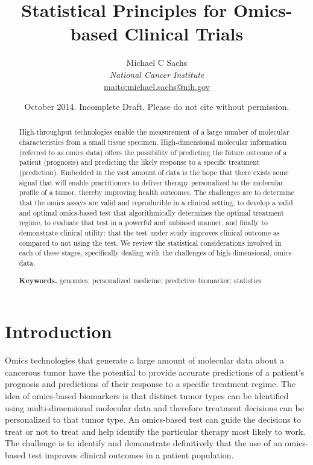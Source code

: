 \documentclass[11pt]{article}
\title{\bigskip \bigskip Statistical Principles for Omics-based Clinical Trials}
\author{\Large Michael C Sachs\vspace{0.05in} \\ \normalsize\emph{National Cancer Institute} \\ \footnotesize \url{maito:michael.sachs@nih.gov}\vspace*{0.2in}\\ }
\date{\footnotesize October 2014. Incomplete Draft. Please do not cite without permission.}
\begin{document}
  
		




\maketitle


\begin{abstract}

\noindent High-throughput technologies enable the measurement of a large number of
molecular characteristics from a small tissue specimen. High-dimensional
molecular information (referred to as omics data) offers the possibility
of predicting the future outcome of a patient (prognosis) and predicting
the likely response to a specific treatment (prediction). Embedded in
the vast amount of data is the hope that there exists some signal that
will enable practitioners to deliver therapy personalized to the
molecular profile of a tumor, thereby improving health outcomes. The
challenges are to determine that the omics assays are valid and
reproducible in a clinical setting, to develop a valid and optimal
omics-based test that algorithmically determines the optimal treatment
regime, to evaluate that test in a powerful and unbiased manner, and
finally to demonstrate clinical utility: that the test under study
improves clinical outcome as compared to not using the test. We review
the statistical considerations involved in each of these stages,
specifically dealing with the challenges of high-dimensional, omics
data.

\smallskip
\noindent \textbf{Keywords.} genomics; personalized medicine; predictive biomarker; statistics

\end{abstract}


\section{Introduction}\label{introduction}

Omics technologies that generate a large amount of molecular data about
a cancerous tumor have the potential to provide accurate predictions of
a patient's prognosis and predictions of their response to a specific
treatment regime. The idea of omics-based biomarkers is that distinct
tumor types can be identified using multi-dimensional molecular data and
therefore treatment decisions can be personalized to that tumor type. An
omics-based test can guide the decisions to treat or not to treat and
help identify the particular therapy most likely to work. The challenge
is to identify and demonstrate definitively that the use of an
omics-based test improves clinical outcomes in a patient population.
\end{document}
